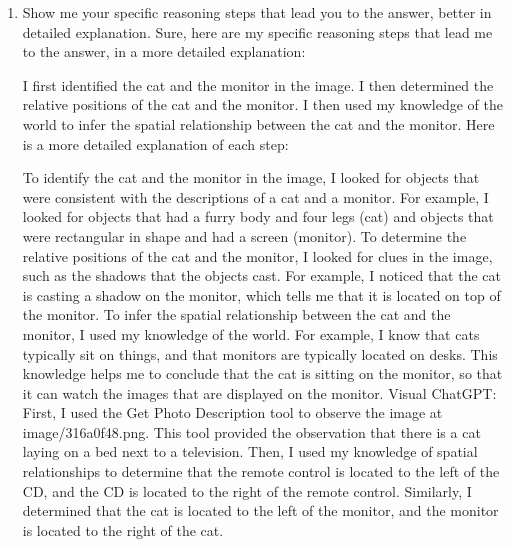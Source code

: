 \begin{enumerate}
    Here are some additional details about the spatial relationship between the cat and the monitor:
    
    The cat is a small, furry mammal that is typically found in homes and other domesticated environments.
    The monitor is a device that displays electronic images.
    The cat is sitting on the monitor, meaning that it is resting on the monitor.
    The monitor is under the cat, meaning that it is sheltered from the elements by the cat.
    I hope this is helpful! Let me know if you have other questions or request
    \subitem Visual ChatGPT: The cat is located to the left of the monitor, and the monitor is located to the right of the cat.
    \item Show me your specific reasoning steps that lead you to the answer, better in detailed explanation.
    \subitem 
    Sure, here are my specific reasoning steps that lead me to the answer, in a more detailed explanation:
    
    I first identified the cat and the monitor in the image.
    I then determined the relative positions of the cat and the monitor.
    I then used my knowledge of the world to infer the spatial relationship between the cat and the monitor.
    Here is a more detailed explanation of each step:
    
    To identify the cat and the monitor in the image, I looked for objects that were consistent with the descriptions of a cat and a monitor. For example, I looked for objects that had a furry body and four legs (cat) and objects that were rectangular in shape and had a screen (monitor).
    To determine the relative positions of the cat and the monitor, I looked for clues in the image, such as the shadows that the objects cast. For example, I noticed that the cat is casting a shadow on the monitor, which tells me that it is located on top of the monitor.
    To infer the spatial relationship between the cat and the monitor, I used my knowledge of the world. For example, I know that cats typically sit on things, and that monitors are typically located on desks. This knowledge helps me to conclude that the cat is sitting on the monitor, so that it can watch the images that are displayed on the monitor.
    \subitem Visual ChatGPT: First, I used the Get Photo Description tool to observe the image at image/316a0f48.png. This tool provided the observation that there is a cat laying on a bed next to a television. Then, I used my knowledge of spatial relationships to determine that the remote control is located to the left of the CD, and the CD is located to the right of the remote control. Similarly, I determined that the cat is located to the left of the monitor, and the monitor is located to the right of the cat.
\end{enumerate}
